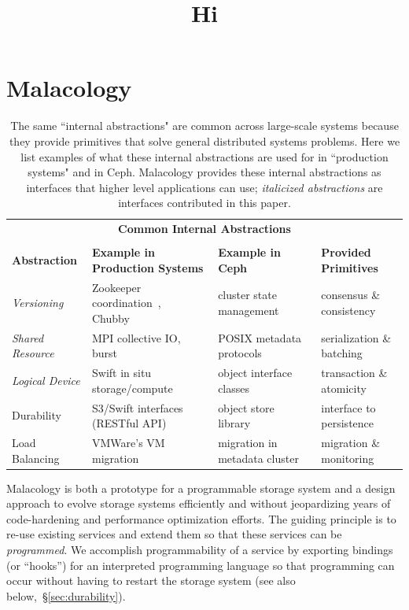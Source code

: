 \documentclass[preprint]{sigplanconf-eurosys}
\begin{document}
\section{Malacology}
\label{sec:malacology}

\begin{table}
\centering
\title{Hi}
\begin{tabular}{  l | l | l | l }
\multicolumn{4}{c}{\Large \textbf{Common Internal Abstractions}} \\
\multicolumn{4}{c}{} \\
\textbf{Abstraction}                    &
\textbf{Example in Production Systems}  &
\textbf{Example in Ceph}                &
\textbf{Provided Primitives}            \\ \hline
{\it Versioning}
  & Zookeeper coordination~\cite{hunt_zookeeper_2010}, Chubby~\cite{website:chubby}
  & cluster state management~\cite{website:ceph-mon}
  & consensus \& consistency
  \\
{\it Shared Resource}
  & MPI collective IO, burst
  & POSIX metadata protocols
  & serialization \& batching
  \\
{\it Logical Device}
  & Swift in situ storage/compute~\cite{website:zerocloud}
  & object interface classes~\cite{website:cls-lua}
  & transaction \& atomicity
  \\
Durability
  & S3/Swift interfaces (RESTful API)
  & object store library~\cite{weil_rados_2007}
  & interface to persistence
  \\
Load Balancing
  & VMWare's VM migration~\cite{vmware-drs,gulati:hotcloud2011-cloud-resource-management} 
  & migration in metadata cluster~\cite{weil:sc2004-dyn-metadata}
  & migration \& monitoring
  \\
\end{tabular}
\caption{The same ``internal abstractions" are common across large-scale
systems because they provide primitives that solve general distributed systems
problems.  Here we list examples of what these internal abstractions are used
for in ``production systems" and in Ceph.  Malacology provides these internal
abstractions as interfaces that higher level applications can use; {\it
italicized abstractions} are interfaces contributed in this paper.}
\label{table:examples}
\end{table}

Malacology is both a prototype for a programmable storage system and a design
approach to evolve storage systems efficiently and without jeopardizing years
of code-hardening and performance optimization efforts. The guiding principle
is to re-use existing services and extend them so that these services can be
\emph{programmed}. We accomplish programmability of a service by exporting
bindings (or ``hooks'') for an interpreted programming language so that
programming can occur without having to restart the storage system (see also
below,~\S\ref{sec:durability}). 
\end{document}
